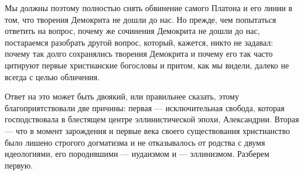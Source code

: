 Мы должны поэтому полностью снять обвинение самого Платона и его линии
в  том,  что творения  Демокрита  не  дошли  до  нас. Но  прежде,  чем
попытаться ответить на вопрос, почему  же сочинения Демокрита не дошли
до нас,  постараемся разобрать другой вопрос,  который, кажется, никто
не задавал: почему  так долго сохранялись творения  Демокрита и почему
его так часто цитируют первые  христианские богословы и притом, как мы
видели, далеко не всегда с целью обличения.

Ответ  на  это  может  быть двоякий,  или  правильнее  сказать,  этому
благоприятствовали  две причины:  первая  --- исключительная  свобода,
которая  господствовала  в  блестящем  центре  эллинистической  эпохи,
Александрии. Вторая ---  что в момент зарождения и  первые века своего
существования  христианство  было  лишено  строгого  догматизма  и  не
отказывалось  от  родства с  двумя  идеологиями,  его породившими  ---
иудаизмом и --- эллинизмом. Разберем первую.

